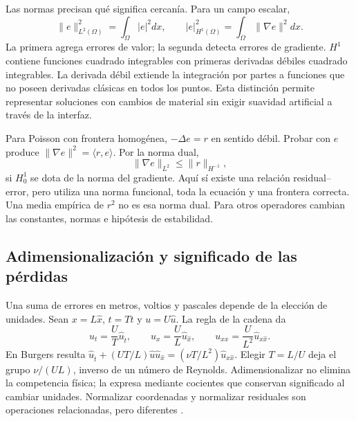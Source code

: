 Las normas precisan qué significa cercanía. Para un campo escalar,
\begin{equation}
\|e\|_{L^2(\Omega)}^2=\int_\Omega |e|^2dx,\qquad
|e|_{H^1(\Omega)}^2=\int_\Omega\|\nabla e\|^2dx.
\end{equation}
La primera agrega errores de valor; la segunda detecta errores de gradiente. $H^1$ contiene funciones cuadrado integrables con primeras derivadas débiles cuadrado integrables. La derivada débil extiende la integración por partes a funciones que no poseen derivadas clásicas en todos los puntos. Esta distinción permite representar soluciones con cambios de material sin exigir suavidad artificial a través de la interfaz.

Para Poisson con frontera homogénea, $-\Delta e=r$ en sentido débil. Probar con $e$ produce $\|\nabla e\|^2=\langle r,e\rangle$. Por la norma dual,
\begin{equation}
\|\nabla e\|_{L^2}\leq\|r\|_{H^{-1}},
\end{equation}
si $H_0^1$ se dota de la norma del gradiente. Aquí sí existe una relación residual--error, pero utiliza una norma funcional, toda la ecuación y una frontera correcta. Una media empírica de $r^2$ no es esa norma dual. Para otros operadores cambian las constantes, normas e hipótesis de estabilidad.

\subsection{Adimensionalización y significado de las pérdidas}
Una suma de errores en metros, voltios y pascales depende de la elección de unidades. Sean $x=L\hat x$, $t=T\hat t$ y $u=U\hat u$. La regla de la cadena da
\begin{equation}
u_t=\frac UT\hat u_{\hat t},\qquad
u_x=\frac UL\hat u_{\hat x},\qquad
u_{xx}=\frac U{L^2}\hat u_{\hat x\hat x}.
\label{eq:escalas}
\end{equation}
En Burgers resulta $\hat u_{\hat t}+(UT/L)\hat u\hat u_{\hat x}=(\nu T/L^2)\hat u_{\hat x\hat x}$. Elegir $T=L/U$ deja el grupo $\nu/(UL)$, inverso de un número de Reynolds. Adimensionalizar no elimina la competencia física; la expresa mediante cocientes que conservan significado al cambiar unidades. Normalizar coordenadas y normalizar residuales son operaciones relacionadas, pero diferentes \cite{wang2023expertguide}.


